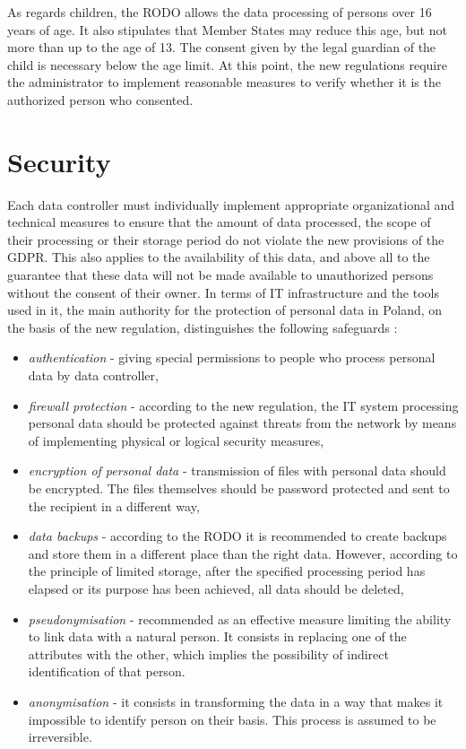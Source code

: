\documentclass[en, noamssymb]{mgr}
\begin{document}
\indent As regards children, the RODO allows the data processing of persons over 16 years of age. It also stipulates that Member States may reduce this age, but not more than up to the age of 13. The consent given by the legal guardian of the child is necessary below the age limit. At this point, the new regulations require the administrator to implement reasonable measures to verify whether it is the authorized person who consented.

\section{Security}

Each data controller must individually implement appropriate organizational and technical measures to ensure that the amount of data processed, the scope of their processing or their storage period do not violate the new provisions of the GDPR. This also applies to the availability of this data, and above all to the guarantee that these data will not be made available to unauthorized persons without the consent of their owner. In terms of IT infrastructure and the tools used in it, the main authority for the protection of personal data in Poland, on the basis of the new regulation, distinguishes the following safeguards \cite{lexdigital_srodki}:

\begin{itemize}

\item \textit{authentication} - giving special permissions to people who process personal data by data controller,

\item \textit{firewall protection} - according to the new regulation, the IT system processing personal data should be protected against threats from the network by means of implementing physical or logical security measures,

\item \textit{encryption of personal data} - transmission of files with personal data should be encrypted. The files themselves should be password protected and sent to the recipient in a different way,

\item \textit{data backups} - according to the RODO it is recommended to create backups and store them in a different place than the right data. However, according to the principle of limited storage, after the specified processing period has elapsed or its purpose has been achieved, all data should be deleted,

\item \textit{pseudonymisation} - recommended as an effective measure limiting the ability to link data with a natural person. It consists in replacing one of the attributes with the other, which implies the possibility of indirect identification of that person.

\item \textit{anonymisation} - it consists in transforming the data in a way that makes it impossible to identify person on their basis. This process is assumed to be irreversible.

\end{itemize}
\end{document}
